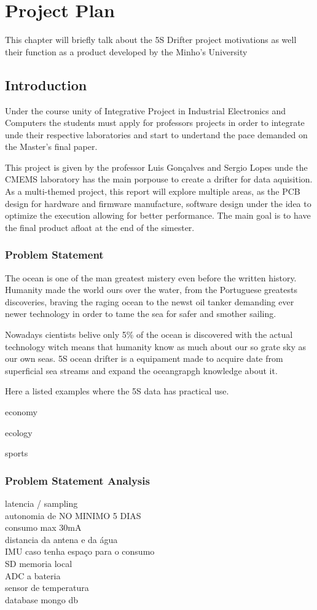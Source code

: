\chapter{Project Plan}
    This chapter will briefly talk about the 5S Drifter project motivations as well their function as a product developed 
    by the Minho's University  
\section{Introduction}
Under the course unity of Integrative Project in Industrial Electronics and Computers the students must
apply for professors projects in order to integrate unde their respective laboratories and start to undertand the pace
demanded on the Master's final paper.

This project is given by the professor Luis Gonçalves and Sergio Lopes unde the CMEMS laboratory
has the main porpouse to create a drifter for data aquisition. As a multi-themed project, this report will
explore multiple areas, as the PCB design for hardware and firmware manufacture, software design under the idea to optimize
the execution allowing for better performance. The main goal is to have the final product afloat at the end of the simester.
\subsection{Problem Statement}
The ocean is one of the man greatest mistery even before the written history. Humanity made the world ours over the water, 
from the Portuguese greatests discoveries, braving the raging ocean to the newst oil tanker demanding ever newer technology
in order to tame the sea for safer and smother sailing.

Nowadays cientists belive only 5\% of the ocean is discovered with the actual technology witch means that humanity 
know as much about our so grate sky as our own seas. 5S ocean drifter is a equipament made to acquire date from 
superficial sea streams and expand the oceangrapgh knowledge about it.

Here a listed examples where the 5S data has practical use.

economy

ecology

sports
\subsection{Problem Statement Analysis}

latencia / sampling \\
autonomia de NO MINIMO 5 DIAS \\
    consumo max 30mA \\
distancia da antena e da água \\
IMU caso tenha espaço para o consumo \\
SD memoria local \\
ADC a bateria \\
sensor de temperatura \\
database mongo db \\
